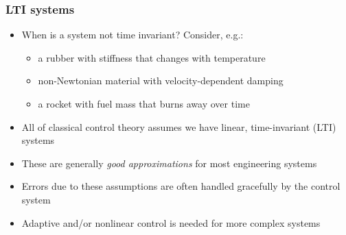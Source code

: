\documentclass{beamer-control}
\begin{document}
\begin{frame}
\frametitle{LTI systems}
\begin{itemize}
\item When is a system not time invariant? Consider, e.g.:
\begin{itemize}
\item a rubber with stiffness that changes with temperature
\item non-Newtonian material with velocity-dependent damping
\item a rocket with fuel mass that burns away over time
\end{itemize}
\item All of classical control theory assumes we have linear, time-invariant (LTI) systems
\item These are generally \emph{good approximations} for most engineering systems
\item Errors due to these assumptions are often handled gracefully by the control system
\item Adaptive and/or nonlinear control is needed for more complex systems
\end{itemize}
\end{frame}

\SUMMARYFRAME
\FINALE
\end{document}
